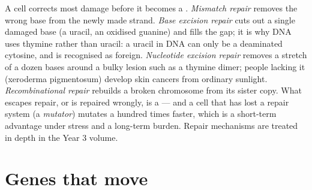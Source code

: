 \begin{proposition}\label{prop:b2:genome-diversification:repair}
A cell corrects most damage before it becomes a .
\emph{Mismatch repair} removes the wrong base from the newly made
strand. \emph{Base excision repair} cuts out a single damaged base
(a uracil, an oxidised guanine) and fills the gap; it is why DNA
uses thymine rather than uracil: a uracil in DNA can only be a
deaminated cytosine, and is recognised as foreign. \emph{Nucleotide
excision repair} removes a stretch of a dozen bases around a bulky
lesion such as a thymine dimer; people lacking it (xeroderma
pigmentosum) develop skin cancers from ordinary sunlight.
\emph{Recombinational repair} rebuilds a broken chromosome from its
sister copy. What escapes repair, or is repaired wrongly, is a
 --- and a cell that has lost a repair system (a
\emph{mutator}) mutates a hundred times faster, which is a
short-term advantage under stress and a long-term burden. Repair
mechanisms are treated in depth in the Year 3 volume.
\end{proposition}

\section{Genes that move}

